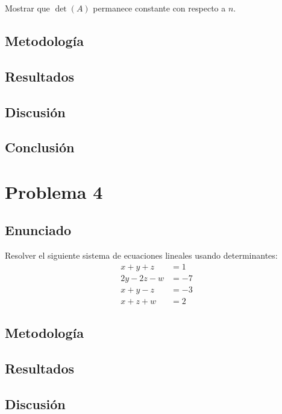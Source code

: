 \documentclass{article}
\begin{document}
Mostrar que $\det(A)$ permanece constante con respecto a $n$.

\subsection{Metodología}

\subsection{Resultados}
\setcounter{equation}{0}

\subsection{Discusión}

\subsection{Conclusión}

\section{Problema 4}

\subsection{Enunciado}
Resolver el siguiente sistema de ecuaciones lineales usando determinantes:
\begin{align}
x + y + z &= 1 \\
2y - 2z - w &= -7 \\
x + y - z &= -3 \\
x + z + w &= 2
\end{align}

\subsection{Metodología}

\subsection{Resultados}
\setcounter{equation}{0}

\subsection{Discusión}
\end{document}
